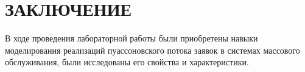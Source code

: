 \section*{ЗАКЛЮЧЕНИЕ}

В ходе проведения лабораторной работы были приобретены навыки моделирования
реализаций пуассоновского потока заявок в системах массового обслуживания, были
исследованы его свойства и характеристики.

\newpage
